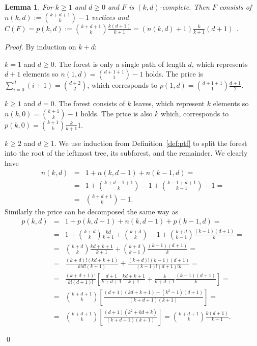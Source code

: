 \documentclass{llncs}
\newtheorem{lemma}[definition]{Lemma}
\newcommand{\todo}[1]{\noindent{[{\bf ToDo:} #1]}}
\begin{document}
\todo{I'd use a simpler proof with a worse estimate for which we have adopted the results in the reduction section. However n:= should be n = in the following claim (i guess).} 
\begin{lemma}
\label{lm:k-d-complete}
For $k \ge 1$ and $d \ge 0$ and $F$ is $(k, d)$-complete.
Then $F$ consists of $n(k, d) := \binom{k+d+1}{k} - 1$ vertices and $C(F) = p(k,d):=\binom{k+d+1}{k} \frac{k(d+1)}{k+1} = (n(k,d)+1)\frac{k}{k+1}(d+1)$ .
\end{lemma}
\begin{proof}
By induction on $k+d$:
\begin{case}
$k=1$ and $d\ge0$. The forest is only a single path of length $d$,
which represents $d+1$ elements so $n\left(1,d\right)=\binom{d+1+1}{1}-1$
holds. The price is $\sum_{i=0}^{d}(i+1)=\binom{d+2}{2}$,
which corresponds to $p(1,d)=\binom{d+1+1}{1}\frac{d+1}{2}$.
\end{case}

\begin{case}
$k\ge1$ and $d=0$. The forest consists of $k$ leaves, which represent
$k$ elements so $n(k,0)=\binom{k+1}{k}-1$ holds. The
price is also $k$ which, corresponds to $p(k,0)=\binom{k+1}{k}\frac{k}{k+1}1$.
\end{case}

\begin{case}
$k\ge2$ and $d\ge1$. We use induction from Definition~\ref{def:ptf}
to split the forest into the root of the leftmost tree, its subforest, and the remainder.
We clearly have
\begin{eqnarray*}
n(k,d) & = & 1+n(k,d-1)+n(k-1,d)=\\
 & = & 1+\binom{k+d-1+1}{k}-1+\binom{k-1+d+1}{k-1}-1=\\
 & = & \binom{k+d+1}{k}-1.
\end{eqnarray*}
Similarly the price can be decomposed the same way as
\begin{eqnarray*}
	p(k,d)
	& = &	1 + p(k,d-1) + n(k,d-1) + p(k-1,d) = \\
	& = &	1 + \binom{k+d}{k} \frac{kd}{k+1} + \binom{k+d}{k} - 1 + \binom{k+d}{k-1} \frac{(k-1)(d+1)}{k}= \\
	& = &	\binom{k+d}{k}\frac{kd+k+1}{k+1}+\binom{k+d}{k-1}\frac{(k-1)(d+1)}{k}=\\
	& = &	\frac{(k+d)!(kd+k+1)}{k!d!(k+1)} + \frac{(k+d)!(k-1)(d+1)}{(k-1)!(d+1)!k} = \\
	& = &	\frac{(k+d+1)!}{k!(d+1)!} \left[
		\frac{d+1}{k+d+1} \frac{kd+k+1}{k+1} + \frac{k}{k+d+1} \frac{(k-1)(d+1)}{k}
		\right] = \\
	& = &	\binom{k+d+1}{k} \left[
		\frac{ (d+1)(kd+k+1) + (k^{2}-1)(d+1) }{(k+d+1)(k+1)}
		\right] = \\
	& = & \binom{k+d+1}{k} \left[
		\frac{ (d+1) (k^{2}+kd+k)}{(k+d+1)(k+1)}
		\right] = \binom{k+d+1}{k} \frac{k(d+1)}{k+1}.
\end{eqnarray*}

\end{case}
\qed
\end{proof}
\end{document}

